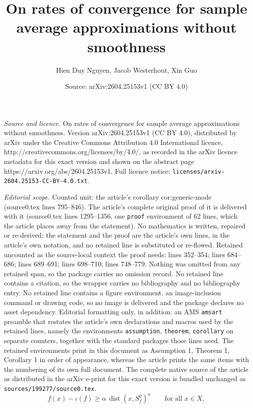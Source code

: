 \documentclass[10pt,a4paper]{amsart}
\title{On rates of convergence for sample average approximations without smoothness}
\author{Hien Duy Nguyen, Jacob Westerhout, Xin Guo}
\date{Source: arXiv:2604.25153v1 (CC BY 4.0)}
\begin{document}
\maketitle

\noindent\emph{Source and licence.} On rates of convergence for sample average approximations without smoothness. Version arXiv:2604.25153v1 (CC BY 4.0), distributed by arXiv under the Creative Commons Attribution 4.0 International licence, http://creativecommons.org/licenses/by/4.0/, as recorded in the arXiv licence metadata for this exact version and shown on the abstract page https://arxiv.org/abs/2604.25153v1. Full licence notice: \texttt{licenses/arxiv-2604.25153-CC-BY-4.0.txt}.\par\smallskip

\noindent\textit{Editorial scope.} Counted unit: the article's corollary cor:generic-mode (source0.tex lines 795--846). The article's complete original proof of it is delivered with it (source0.tex lines 1295--1356, one \texttt{proof} environment of 62 lines, which the article places away from the statement). No mathematics is written, repaired or re-derived: the statement and the proof are the article's own lines, in the article's own notation, and no retained line is substituted or re-flowed.  Retained uncounted as the source-local context the proof needs: lines 352--354; lines 684--686; lines 689--691; lines 698--710; lines 748--779.  Nothing was omitted from any retained span, so the package carries no omission record.  No retained line contains a citation, so the wrapper carries no bibliography and no bibliography entry.  No retained line contains a figure environment, an image-inclusion command or drawing code, so no image is delivered and the package declares no asset dependency.  Editorial formatting only, in addition: an AMS \texttt{amsart} preamble that restates the article's own declarations and macros used by the retained lines, namely the environments \texttt{assumption}, \texttt{theorem}, \texttt{corollary} on separate counters, together with the standard packages those lines need.  The retained environments print in this document as Assumption 1, Theorem 1, Corollary 1 in order of appearance, whereas the article prints the same items with the numbering of its own full document.  The complete native source of the article as distributed in the arXiv e-print for this exact version is bundled unchanged as \texttt{sources/199277/source0.tex}.
\begin{equation}
f(x)-\iota(f)\ge\alpha\,\operatorname{dist}(x,S_{f}^{0})^{\kappa}\qquad\text{for all }x\in X,\label{eq:sharp-growth}
\end{equation}
\end{document}

